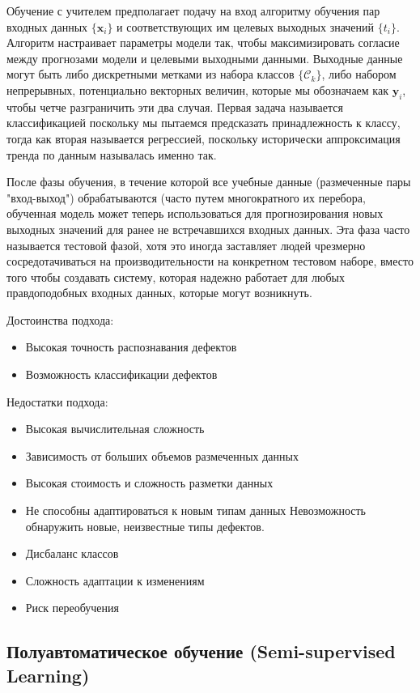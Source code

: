 \documentclass[14pt,a4paper]{article}
\begin{document}
Обучение с учителем предполагает подачу на вход алгоритму обучения пар входных данных \(\{\mathbf{x}_{i}\}\) и соответствующих им целевых выходных значений \(\{t_{i}\}\). Алгоритм настраивает параметры модели так, чтобы максимизировать согласие между прогнозами модели и целевыми выходными данными. Выходные данные могут быть либо дискретными метками из набора классов \(\{\mathcal{C}_{k}\}\), либо набором непрерывных, потенциально векторных величин, которые мы обозначаем как \(\mathbf{y}_{i}\), чтобы четче разграничить эти два случая. Первая задача называется классификацией поскольку мы пытаемся предсказать принадлежность к классу, тогда как вторая называется регрессией, поскольку исторически аппроксимация тренда по данным называлась именно так.

После фазы обучения, в течение которой все учебные данные (размеченные пары "вход-выход") обрабатываются (часто путем многократного их перебора, обученная модель может теперь использоваться для прогнозирования новых выходных значений для ранее не встречавшихся входных данных. Эта фаза часто называется тестовой фазой, хотя это иногда заставляет людей чрезмерно сосредотачиваться на производительности на конкретном тестовом наборе, вместо того чтобы создавать систему, которая надежно работает для любых правдоподобных входных данных, которые могут возникнуть. \cite{Szeliski2022}

Достоинства подхода:
\begin{itemize}
	\item Высокая точность распознавания дефектов
	\item Возможность классификации дефектов
\end{itemize}

Недостатки подхода:
\begin{itemize}
	\item Высокая вычислительная сложность
	\item Зависимость от больших объемов размеченных данных
	\item Высокая стоимость и сложность разметки данных
	\item Не способны адаптироваться к новым типам данных \cite{Li2025} Невозможность обнаружить новые, неизвестные типы дефектов.
	\item Дисбаланс классов
	\item Сложность адаптации к изменениям
	\item Риск переобучения
\end{itemize}

\subsection{Полуавтоматическое обучение (Semi-supervised Learning)}
\end{document}
